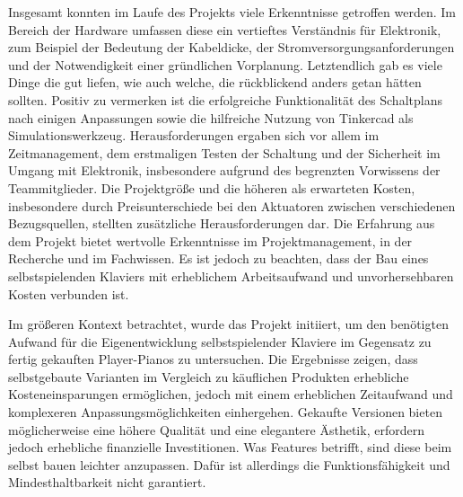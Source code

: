 Insgesamt konnten im Laufe des Projekts viele Erkenntnisse getroffen werden.
Im Bereich der Hardware umfassen diese ein vertieftes Verständnis für Elektronik, zum Beispiel der Bedeutung der Kabeldicke, der Stromversorgungsanforderungen und der Notwendigkeit einer gründlichen Vorplanung. %
Letztendlich gab es viele Dinge die gut liefen, wie auch welche, die rückblickend anders getan hätten sollten.
Positiv zu vermerken ist die erfolgreiche Funktionalität des Schaltplans nach einigen Anpassungen sowie die hilfreiche Nutzung von Tinkercad als Simulationswerkzeug. %
Herausforderungen ergaben sich vor allem im Zeitmanagement, dem erstmaligen Testen der Schaltung und der Sicherheit im Umgang mit Elektronik, insbesondere aufgrund des begrenzten Vorwissens der Teammitglieder. %
Die Projektgröße und die höheren als erwarteten Kosten, insbesondere durch Preisunterschiede bei den Aktuatoren zwischen verschiedenen Bezugsquellen, stellten zusätzliche Herausforderungen dar. %
Die Erfahrung aus dem Projekt bietet wertvolle Erkenntnisse im Projektmanagement, in der Recherche und im Fachwissen.
Es ist jedoch zu beachten, dass der Bau eines selbstspielenden Klaviers mit erheblichem Arbeitsaufwand und unvorhersehbaren Kosten verbunden ist. %

Im größeren Kontext betrachtet, wurde das Projekt initiiert, um den benötigten Aufwand für die Eigenentwicklung selbstspielender Klaviere im Gegensatz zu fertig gekauften Player-Pianos zu untersuchen. %
Die Ergebnisse zeigen, dass selbstgebaute Varianten im Vergleich zu käuflichen Produkten erhebliche Kosteneinsparungen ermöglichen, jedoch mit einem erheblichen Zeitaufwand und komplexeren Anpassungsmöglichkeiten einhergehen.
Gekaufte Versionen bieten möglicherweise eine höhere Qualität und eine elegantere Ästhetik, erfordern jedoch erhebliche finanzielle Investitionen.
Was Features betrifft, sind diese beim selbst bauen leichter anzupassen.
Dafür ist allerdings die Funktionsfähigkeit und  Mindesthaltbarkeit nicht garantiert.


